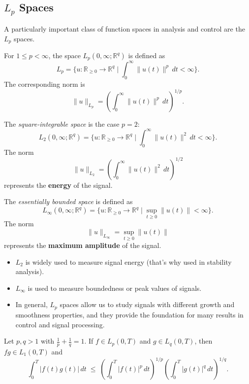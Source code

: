 \subsection{$L_p$ Spaces}

A particularly important class of function spaces in analysis and control are the $L_p$ spaces.

\begin{definition}[$L_p$ space]
For $1 \leq p < \infty$, the space $L_p(0,\infty;\mathbb{R}^q)$ is defined as
\[
L_p = \Big\{ u:\mathbb{R}_{\geq 0}\to \mathbb{R}^q \;\Big|\;
\int_{0}^{\infty} \|u(t)\|^p \, dt < \infty \Big\}.
\]
The corresponding norm is
\[
\|u\|_{L_p} = \left( \int_{0}^{\infty} \|u(t)\|^p \, dt \right)^{1/p}.
\]
\end{definition}

\begin{definition}[$L_2$ space]
The \emph{square-integrable space} is the case $p=2$:
\[
L_2(0,\infty;\mathbb{R}^q) 
= \Big\{ u:\mathbb{R}_{\geq 0}\to \mathbb{R}^q \;\Big|\;
\int_{0}^{\infty} \|u(t)\|^2 \, dt < \infty \Big\}.
\]
The norm
\[
\|u\|_{L_2} = \left( \int_{0}^{\infty} \|u(t)\|^2 \, dt \right)^{1/2}
\]
represents the \textbf{energy} of the signal.
\end{definition}

\begin{definition}
The \emph{essentially bounded space} is defined as
\[
L_\infty(0,\infty;\mathbb{R}^q) 
= \Big\{ u:\mathbb{R}_{\geq 0}\to \mathbb{R}^q \;\Big|\;
\sup_{t \geq 0} \|u(t)\| < \infty \Big\}.
\]
The norm
\[
\|u\|_{L_\infty} = \sup_{t \geq 0} \|u(t)\|
\]
represents the \textbf{maximum amplitude} of the signal.
\end{definition}

\begin{remark}
\begin{itemize}
\item  $L_2$ is widely used to measure signal energy (that's why used in stability analysis).  
\item  $L_\infty$ is used to measure boundedness or peak values of signals.  
\item  In general, $L_p$ spaces allow us to study signals with different growth and smoothness properties, and they provide the foundation for many results in control and signal processing.
\end{itemize}
\end{remark}

\begin{proposition}
Let $p,q > 1$ with $\tfrac{1}{p}+\tfrac{1}{q}=1$.  
If $f \in L_p(0,T)$ and $g \in L_q(0,T)$, then $fg \in L_1(0,T)$ and 
\[
\int_{0}^{T} |f(t)g(t)| \, dt 
\;\leq\;
\left( \int_{0}^{T} |f(t)|^p \, dt \right)^{1/p}
\left( \int_{0}^{T} |g(t)|^q \, dt \right)^{1/q}.
\]
\end{proposition}

